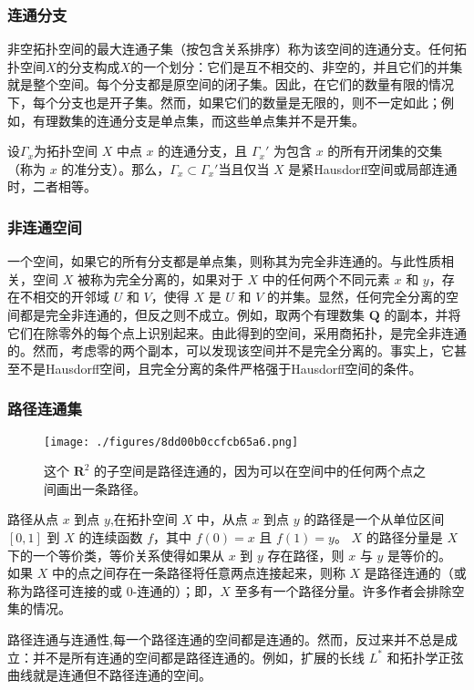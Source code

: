 \subsubsection{连通分支}
非空拓扑空间的最大连通子集（按包含关系排序）称为该空间的连通分支。任何拓扑空间$X$的分支构成$X$的一个划分：它们是互不相交的、非空的，并且它们的并集就是整个空间。每个分支都是原空间的闭子集。因此，在它们的数量有限的情况下，每个分支也是开子集。然而，如果它们的数量是无限的，则不一定如此；例如，有理数集的连通分支是单点集，而这些单点集并不是开集。

设$\Gamma_x$为拓扑空间 $X$ 中点 $x$ 的连通分支，且 $\Gamma_x'$ 为包含 $x$ 的所有开闭集的交集（称为 $x$ 的准分支）。那么，$\Gamma_x \subset \Gamma_x'$当且仅当 $X$ 是紧Hausdorff空间或局部连通时，二者相等。
\subsubsection{非连通空间}
一个空间，如果它的所有分支都是单点集，则称其为完全非连通的。与此性质相关，空间 $X$ 被称为完全分离的，如果对于 $X$ 中的任何两个不同元素 $x$ 和 $y$，存在不相交的开邻域 $U$ 和 $V$，使得 $X$ 是 $U$ 和 $V$ 的并集。显然，任何完全分离的空间都是完全非连通的，但反之则不成立。例如，取两个有理数集 $\mathbf{Q}$ 的副本，并将它们在除零外的每个点上识别起来。由此得到的空间，采用商拓扑，是完全非连通的。然而，考虑零的两个副本，可以发现该空间并不是完全分离的。事实上，它甚至不是Hausdorff空间，且完全分离的条件严格强于Hausdorff空间的条件。
\subsubsection{路径连通集}
\begin{figure}[ht]
\centering
\texttt{[image: ./figures/8dd00b0ccfcb65a6.png]}
\caption{这个 $\mathbf{R}^2$ 的子空间是路径连通的，因为可以在空间中的任何两个点之间画出一条路径。} \label{fig_DJTP_2}
\end{figure}
路径从点 $x$ 到点 $y$,在拓扑空间 $X$ 中，从点 $x$ 到点 $y$ 的路径是一个从单位区间 $[0,1]$ 到 $X$ 的连续函数 $f$，其中 $f(0) = x$ 且 $f(1) = y$。
$X$ 的路径分量是 $X$ 下的一个等价类，等价关系使得如果从 $x$ 到 $y$ 存在路径，则 $x$ 与 $y$ 是等价的。
如果 $X$ 中的点之间存在一条路径将任意两点连接起来，则称 $X$ 是路径连通的（或称为路径可连接的或 0-连通的）；即，$X$ 至多有一个路径分量。许多作者会排除空集的情况。

路径连通与连通性,每一个路径连通的空间都是连通的。然而，反过来并不总是成立：并不是所有连通的空间都是路径连通的。例如，扩展的长线 $L^*$ 和拓扑学正弦曲线就是连通但不路径连通的空间。

